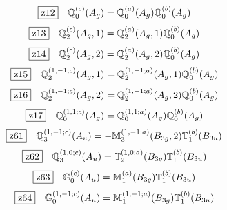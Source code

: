 \documentclass[fleqn,10pt,landscape]{jsarticle}
\begin{document}
\begin{dmath*}
\hspace*{3mm}\fbox{z12}\quad \mathbb{Q}_{0}^{(c)}(A_{g})=\mathbb{Q}_{0}^{(a)}(A_{g}) \mathbb{Q}_{0}^{(b)}(A_{g})
\end{dmath*}
\begin{dmath*}
\hspace*{3mm}\fbox{z13}\quad \mathbb{Q}_{2}^{(c)}(A_{g},1)=\mathbb{Q}_{2}^{(a)}(A_{g},1) \mathbb{Q}_{0}^{(b)}(A_{g})
\end{dmath*}
\begin{dmath*}
\hspace*{3mm}\fbox{z14}\quad \mathbb{Q}_{2}^{(c)}(A_{g},2)=\mathbb{Q}_{2}^{(a)}(A_{g},2) \mathbb{Q}_{0}^{(b)}(A_{g})
\end{dmath*}
\begin{dmath*}
\hspace*{3mm}\fbox{z15}\quad \mathbb{Q}_{2}^{(1,-1;c)}(A_{g},1)=\mathbb{Q}_{2}^{(1,-1;a)}(A_{g},1) \mathbb{Q}_{0}^{(b)}(A_{g})
\end{dmath*}
\begin{dmath*}
\hspace*{3mm}\fbox{z16}\quad \mathbb{Q}_{2}^{(1,-1;c)}(A_{g},2)=\mathbb{Q}_{2}^{(1,-1;a)}(A_{g},2) \mathbb{Q}_{0}^{(b)}(A_{g})
\end{dmath*}
\begin{dmath*}
\hspace*{3mm}\fbox{z17}\quad \mathbb{Q}_{0}^{(1,1;c)}(A_{g})=\mathbb{Q}_{0}^{(1,1;a)}(A_{g}) \mathbb{Q}_{0}^{(b)}(A_{g})
\end{dmath*}
\begin{dmath*}
\hspace*{3mm}\fbox{z61}\quad \mathbb{Q}_{3}^{(1,-1;c)}(A_{u})=- \mathbb{M}_{3}^{(1,-1;a)}(B_{3g},2) \mathbb{T}_{1}^{(b)}(B_{3u})
\end{dmath*}
\begin{dmath*}
\hspace*{3mm}\fbox{z62}\quad \mathbb{Q}_{3}^{(1,0;c)}(A_{u})=\mathbb{T}_{2}^{(1,0;a)}(B_{3g}) \mathbb{T}_{1}^{(b)}(B_{3u})
\end{dmath*}
\begin{dmath*}
\hspace*{3mm}\fbox{z63}\quad \mathbb{G}_{0}^{(c)}(A_{u})=\mathbb{M}_{1}^{(a)}(B_{3g}) \mathbb{T}_{1}^{(b)}(B_{3u})
\end{dmath*}
\begin{dmath*}
\hspace*{3mm}\fbox{z64}\quad \mathbb{G}_{0}^{(1,-1;c)}(A_{u})=\mathbb{M}_{1}^{(1,-1;a)}(B_{3g}) \mathbb{T}_{1}^{(b)}(B_{3u})
\end{dmath*}
\end{document}
